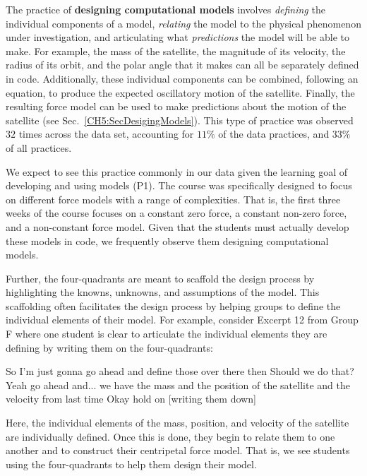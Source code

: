 \documentclass{msuphddissertation}
\begin{document}
\begin{doublespace}
%
%
%

The practice of \textbf{designing computational models} involves \textit{defining} the individual components of a model, \textit{relating} the model to the physical phenomenon under investigation, and articulating what \textit{predictions} the model will be able to make.  For example, the mass of the satellite, the magnitude of its velocity, the radius of its orbit, and the polar angle that it makes can all be separately defined in code.  Additionally, these individual components can be combined, following an equation, to produce the expected oscillatory motion of the satellite.  Finally, the resulting force model can be used to make predictions about the motion of the satellite (see Sec.~\ref{CH5:SecDesigingModels}).  This type of practice was observed $32$ times across the data set, accounting for $11\%$ of the data practices, and $33\%$ of all practices.

We expect to see this practice commonly in our data given the learning goal of developing and using models (P1).  The course was specifically designed to focus on different force models with a range of complexities.  That is, the first three weeks of the course focuses on a constant zero force, a constant non-zero force, and a non-constant force model.  Given that the students must actually develop these models in code, we frequently observe them designing computational models.

Further, the four-quadrants are meant to scaffold the design process by highlighting the knowns, unknowns, and assumptions of the model.  This scaffolding often facilitates the design process by helping groups to define the individual elements of their model.  For example, consider Excerpt 12 from Group F where one student is clear to articulate the individual elements they are defining by writing them on the four-quadrants: \begin{description}
\SA So I'm just gonna go ahead and define those over there then
\SA [writing on 4Q]
\SA Should we do that?
\SB Yeah go ahead and... we have the mass
\SB and the position of the satellite
\SC and the velocity from last time
\SA Okay hold on [writing them down]
\end{description}  Here, the individual elements of the mass, position, and velocity of the satellite are individually defined.  Once this is done, they begin to relate them to one another and to construct their centripetal force model.  That is, we see students using the four-quadrants to help them design their model.


\end{doublespace}
\end{document}
